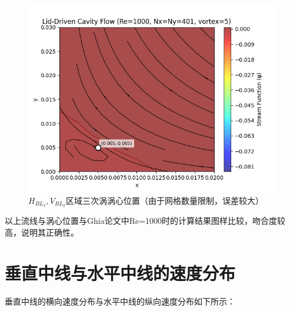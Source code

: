 \documentclass[12pt, a4paper]{article}
\begin{document}
\begin{figure}[htbp]
    \centering
    \includegraphics[width=\textwidth]{pictures/streamline_vortex_5.png}
    \caption{$H_{BL_{2}},V_{BL_{2}}$区域三次涡涡心位置（由于网格数量限制，误差较大）}
\end{figure}

以上流线与涡心位置与Ghia论文中Re=1000时的计算结果图样比较，吻合度较高，说明其正确性。

\section{垂直中线与水平中线的速度分布}
垂直中线的横向速度分布与水平中线的纵向速度分布如下所示：
\end{document}
